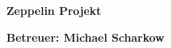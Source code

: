 
\centerline{\textbf{Zeppelin Projekt}}
\centerline{\textbf{Betreuer: Michael Scharkow}}
\vspace{1cm}


\begin{abstract}

\begin{singlespace}
 \textit{\lipsum[3]}
\end{singlespace}



\end{abstract}